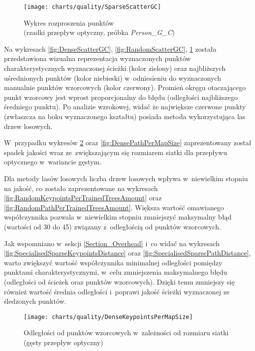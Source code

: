     \newpage
      \begin{figure}[!ht]
        \centering
        \texttt{[image: charts/quality/SparseScatterGC]}
        \caption[Wykres rozproszenia punktów (rzadki przepływ optyczny)]
                {Wykres rozproszenia punktów\\(rzadki przepływ optyczny, próbka \textit{Person\_G\_C})}
        \label{fig:SparseScatterGC}
      \end{figure}

    Na wykresach \ref{fig:DenseScatterGC}, \ref{fig:RandomScatterGC}, \ref{fig:SparseScatterGC} została przedstawiona wizualna reprezentacja wyznaczonych punktów charakterystycznych wyznaczonej ścieżki (kolor zielony) oraz najbliższych uśrednionych punktów (kolor niebieski) w~odniesieniu do wyznaczonych manualnie punktów wzorcowych (kolor czerwony). Promień okręgu otaczającego punkt wzorcowy jest wprost proporcjonalny do błędu (odległości najbliższego średniego punktu). Po analizie wzrokowej, widać że największe czerwone punkty (zwłaszcza na boku wyznaczonego kształtu) posiada metoda wykorzystująca las drzew losowych.

    W~przypadku wykresów \ref{fig:DenseKeypointsPerMapSize} oraz \ref{fig:DensePathPerMapSize} zaprezentowany został spadek jakości wraz ze~zwiększającym się rozmiarem siatki dla przepływu optycznego w~wariancie gęstym.

    Dla metody lasów losowych liczba drzew losowych wpływa w~niewielkim stopniu na jakość, co zostało zaprezentowane na wykresach \ref{fig:RandomKeypointsPerTrainedTreesAmount} oraz \ref{fig:RandomPathPerTrainedTreesAmount}. Większa wartość omawianego współczynnika pozwala w~niewielkim stopniu zmniejszyć maksymalny błąd (wartości od 30 do 45) związany z~odległością od punktów wzorcowych.

    Jak wspomniano w~sekcji \ref{Section_Overhead} i~co widać na wykresach \ref{fig:SpecialisedSparseKeypointsDistance} oraz \ref{fig:SpecialisedSparsePathDistance}, warto zwiększyć wartość współczynnika minimalnej odległości pomiędzy punktami charakterystycznymi, w~celu zmniejszenia maksymalnego błędu (odległości od ścieżek oraz punktów wzorcowych). Dzięki temu zmniejszy się również wartość średnia odległości i~poprawi jakość ścieżki wyznaczonej ze śledzonych punktów.

    \newpage
      \begin{figure}[!ht]
        \centering
        \texttt{[image: charts/quality/DenseKeypointsPerMapSize]}
        \caption[Odległości od punktów wzorcowych w~zależności od rozmiaru siatki]
                {Odległości od punktów wzorcowych w~zależności od rozmiaru siatki (gęsty przepływ optyczny)}
        \label{fig:DenseKeypointsPerMapSize}
      \end{figure}

